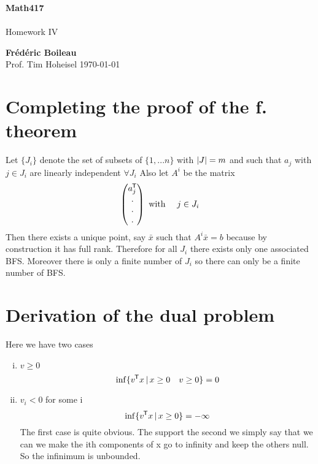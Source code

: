 \documentclass{article}
\DeclarePairedDelimiter{\abs}{\lvert}{\rvert}
\newcommand*{\tran}{^{\mkern-1.5mu\mathsf{T}}}%
\begin{document}
	\begin{titlepage}
		\begin{center}
			\vspace*{1cm}
			\textbf{Math417}\\
			\\
			\vspace{0.5cm}
			Homework IV
			
			\vspace{1.5cm}
			
			\textbf{Frédéric Boileau}\\
			\vspace{2cm}
			Prof. 
			Tim Hoheisel
			\vfill
			\today
			\thispagestyle{empty}
		\end{center}
	\end{titlepage}
	\newpage
	\tableofcontents
	\thispagestyle{empty}
	\clearpage
	
	\section{Completing the proof of the f. theorem}
	
	Let $\{J_i\}$ denote the set of subsets of $\{1,...n\}$ with $\abs{J}=m$ and such that $a_j$ with $j\in J_i$ are linearly independent $\forall J_i$
	Also let $A^i$ be the matrix
	\begin{equation*}
	\begin{pmatrix}
	a_j\tran\\.\\.\\.	\end{pmatrix} \text{ with } \quad j \in J_i
	\end{equation*}
	Then there exists a unique point, say $\bar x$ such that $A^i\bar x=b$ because by construction it has full rank. Therefore for all $J_i$ there exists only one associated BFS. Moreover there is only a finite number of $J_i$ so there can only be a finite number of BFS.
	
	\vspace{2ex}
	\section{Derivation of the dual problem}
	
	Here we have two cases
	\begin{enumerate}[i)]
		\item $v\ge 0$
		\begin{equation*}
			\inf \{v\tran x \,\vert \, x\ge 0 \quad v \ge 0 \} = 0
		\end{equation*}
		\item $v_i < 0$ for some i
		\begin{equation*}
			\inf \{v\tran x \, \vert \, x\ge 0 \} = - \infty
		\end{equation*}
		The first case is quite obvious. The support the second we simply say that we can we make the ith components of x go to infinity and keep the others null. So the infinimum is unbounded.
	\end{enumerate}
	\clearpage
\end{document}
